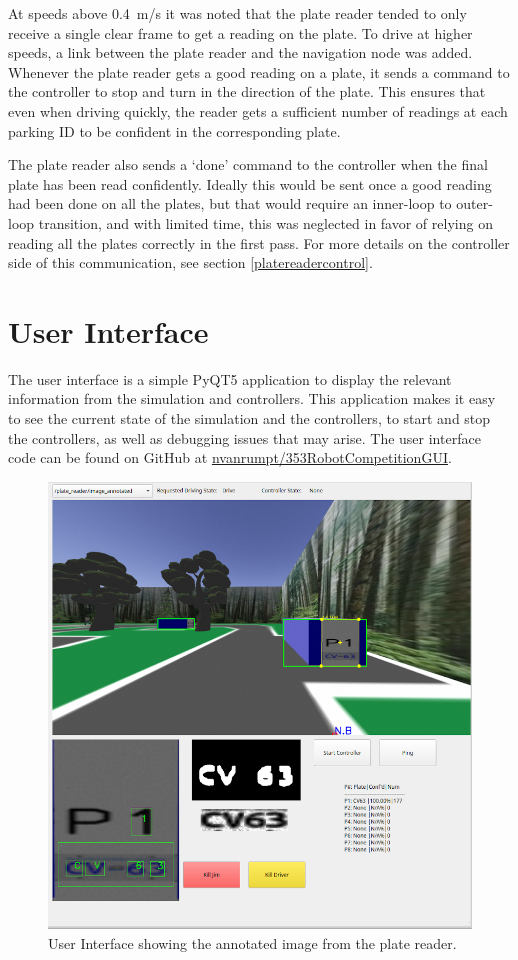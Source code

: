\documentclass[titlepage, twocolumn]{article}
\begin{document}
At speeds above 0.4~m/s it was noted that the plate reader tended to only receive a single clear frame to get a reading on the plate. To drive at higher speeds, a link between the plate reader and the navigation node was added. Whenever the plate reader gets a good reading on a plate, it sends a command to the controller to stop and turn in the direction of the plate. This ensures that even when driving quickly, the reader gets a sufficient number of readings at each parking ID to be confident in the corresponding plate. 

The plate reader also sends a `done' command to the controller when the final plate has been read confidently. Ideally this would be sent once a good reading had been done on all the plates, but that would require an inner-loop to outer-loop transition, and with limited time, this was neglected in favor of relying on reading all the plates correctly in the first pass. For more details on the controller side of this communication, see section \ref{platereadercontrol}.

\section{User Interface}

The user interface is a simple PyQT5 application to display the relevant information from the simulation and controllers. This application makes it easy to see the current state of the simulation and the controllers, to start and stop the controllers, as well as debugging issues that may arise. The user interface code can be found on GitHub at \href{https://github.com/nvanrumpt/353RobotCompetitionGUI}{nvanrumpt/353RobotCompetitionGUI}.

\begin{figure}
\centering
\includegraphics[width=0.8\linewidth]{Gui.png}
\caption{User Interface showing the annotated image from the plate reader.}
\label{fig:UI}
\end{figure}
\end{document}
